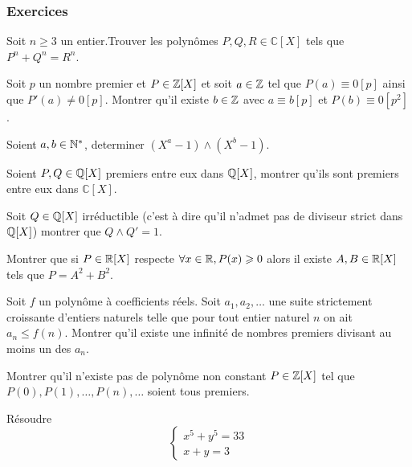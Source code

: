 \subsubsection{Exercices}

\begin{exo}[Liouville,D]
Soit $n\geq 3 $ un entier.Trouver les polynômes $P,Q,R\in \mathbb{C}[X]$ tels que $P^n+Q^n=R^n$. 
\end{exo}


\begin{exo}[Hensel,M-D]
Soit $p$ un nombre premier et $P\in \mathbb Z[X]$ et soit $a\in \mathbb Z$ tel que $P(a)\equiv 0 [p]$ ainsi que $P'(a)\neq 0 [p] $. Montrer qu'il existe $b\in \mathbb Z$ avec $a\equiv b[p]$ et $P(b)\equiv 0 [p^2]$.
\end{exo}

\begin{exo}[Euclide,M]
Soient $a,b\in \mathbb N^*$, determiner $(X^a-1)\wedge(X^b-1) $.
\end{exo}

\begin{exo}
Soient $P,Q\in \mathbb Q[X]$ premiers entre eux dans $\mathbb Q[X]$, montrer qu'ils sont premiers entre eux dans $\mathbb{C}[X]$.
\end{exo}

\begin{exo}
Soit $Q\in \mathbb Q[X]$ irréductible (c'est à dire qu'il n'admet pas de diviseur strict dans $\mathbb Q[X]$) montrer que $Q\wedge Q'=1$.
\end{exo}

\begin{exo}
Montrer que si $P\in \mathbb R[X]$ respecte $\forall x \in \mathbb R, P(x)\geqslant 0$ alors il existe $A,B\in \mathbb R[X]$ tels que $P=A^2+B^2$.
\end{exo}


\begin{exo}[M-D]
Soit $f$ un polynôme à coefficients réels. Soit $a_1,a_2,\ldots$ une suite strictement croissante d'entiers naturels telle que pour tout entier naturel $n$ on ait $a_n\le f(n)$. Montrer qu'il existe une infinité de nombres premiers divisant au moins un des $a_n$.
\end{exo}


\begin{exo}[F-M]
Montrer qu'il n'existe pas de polynôme non constant $P\in \mathbb Z[X]$ tel que $P(0),P(1),\dots,P(n),\dots$ soient tous premiers.
\end{exo}


\begin{exo}[M]
Résoudre $$\left \{
\begin{array}{rcl}
x^5+y^5=33 \\
x+y=3
\end{array}
\right. $$

\end{exo}

